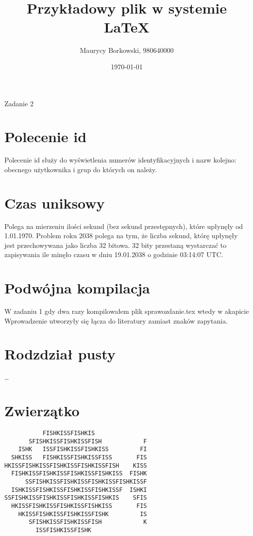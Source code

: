 \documentclass[a4paper]{article}
\author{Maurycy Borkowski, 980640000}
\title{Przykładowy plik w systemie \LaTeX}
\date{\today}
\begin{document}
\maketitle
Zadanie 2

\section{Polecenie id}
Polecenie id służy do wyświetlenia numerów identyfikacyjnych i nazw kolejno: obecnego użytkownika i grup do których on należy.


\section{Czas uniksowy}
Polega na mierzeniu ilości sekund (bez sekund przestępnych), które upłynęły od 1.01.1970.
Problem roku 2038 polega na tym, że liczba sekund, którę upłynęły jest przechowywana jako liczba 32 bitowa. 32 bity przestaną wystarczać to zapisywania ile minęło czasu w dniu 19.01.2038 o godzinie 03:14:07 UTC.

\section{Podwójna kompilacja}
W zadaniu 1 gdy dwa razy kompilowałem plik sprawozdanie.tex wtedy w akapicie Wprowadzenie utworzyły się łącza do literatury zamiast znaków zapytania.

\section{Rodzdział pusty}
\dots

\section{Zwierzątko}
\begin{verbatim}
           FISHKISSFISHKIS               
       SFISHKISSFISHKISSFISH            F
    ISHK   ISSFISHKISSFISHKISS         FI
  SHKISS   FISHKISSFISHKISSFISS       FIS
HKISSFISHKISSFISHKISSFISHKISSFISH    KISS
  FISHKISSFISHKISSFISHKISSFISHKISS  FISHK
      SSFISHKISSFISHKISSFISHKISSFISHKISSF
  ISHKISSFISHKISSFISHKISSFISHKISSF  ISHKI
SSFISHKISSFISHKISSFISHKISSFISHKIS    SFIS
  HKISSFISHKISSFISHKISSFISHKISS       FIS
    HKISSFISHKISSFISHKISSFISHK         IS
       SFISHKISSFISHKISSFISH            K
         ISSFISHKISSFISHK               
\end{verbatim}
\end{document}
